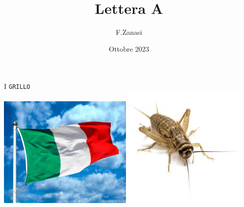 \documentclass[]{article}
\title{Lettera A}
\author{F.Zanasi}
\date{Ottobre 2023}
\begin{document}
{\fontsize{150}{160}\selectfont I} 
\hspace{2.0in}
{\fontsize{80}{80}\color{black}\texttt{GR}\color{blue}\texttt{I}\color{black}\texttt{LLO}} 
\\[1.5cm]
\includegraphics[scale=0.4]{flag-IT1}
\includegraphics[scale=0.4]{grillo}
\end{document}
